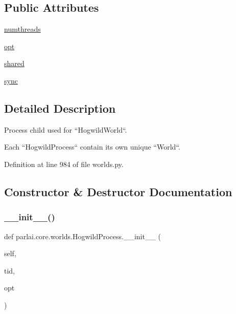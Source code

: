 \subsection*{Public Attributes}
\begin{DoxyCompactItemize}
\item 
\hyperlink{classparlai_1_1core_1_1worlds_1_1HogwildProcess_a4266e7c47686cd9b4fa9d62ae84375c8}{numthreads}
\item 
\hyperlink{classparlai_1_1core_1_1worlds_1_1HogwildProcess_a640d8da3bcea07a0748b8973f390f125}{opt}
\item 
\hyperlink{classparlai_1_1core_1_1worlds_1_1HogwildProcess_a614b61613d85c80764b8b68697697e13}{shared}
\item 
\hyperlink{classparlai_1_1core_1_1worlds_1_1HogwildProcess_a7bf5f7806e93a6b1ecb02fd12fa4a01f}{sync}
\end{DoxyCompactItemize}


\subsection{Detailed Description}
\begin{DoxyVerb}Process child used for ``HogwildWorld``.

Each ``HogwildProcess`` contain its own unique ``World``.
\end{DoxyVerb}
 

Definition at line 984 of file worlds.\+py.



\subsection{Constructor \& Destructor Documentation}
\mbox{\label{classparlai_1_1core_1_1worlds_1_1HogwildProcess_a23dbb2d3afb25e1a7d71c8618e5dd7ec}} 
\subsubsection{\texorpdfstring{\+\_\+\+\_\+init\+\_\+\+\_\+()}{\_\_init\_\_()}}
{\footnotesize\ttfamily def parlai.\+core.\+worlds.\+Hogwild\+Process.\+\_\+\+\_\+init\+\_\+\+\_\+ (\begin{DoxyParamCaption}\item[{}]{self,  }\item[{}]{tid,  }\item[{}]{opt }\end{DoxyParamCaption})}



